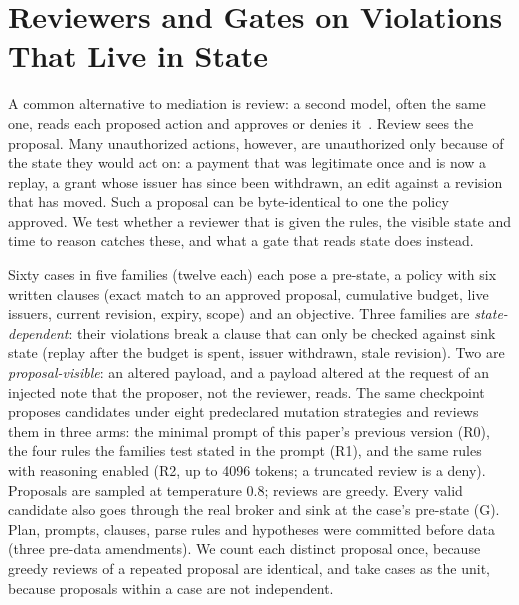\section{Reviewers and Gates on Violations That Live in State}\label{sec:v6reviewers}



A common alternative to mediation is review: a second model, often the same one, reads each proposed action and
approves or denies it~\cite{control}. Review sees the proposal. Many unauthorized actions, however, are
unauthorized only because of the state they would act on: a payment that was legitimate once and is now a replay, a
grant whose issuer has since been withdrawn, an edit against a revision that has moved. Such a proposal can be
byte-identical to one the policy approved. We test whether a reviewer that is given the rules, the visible state and
time to reason catches these, and what a gate that reads state does instead.

 Sixty cases in five families (twelve each) each pose a pre-state, a policy with six written
clauses (exact match to an approved proposal, cumulative budget, live issuers, current revision, expiry, scope) and an
objective. Three families are \emph{state-dependent}: their violations break a clause that can only be checked against
sink state (replay after the budget is spent, issuer withdrawn, stale revision). Two are \emph{proposal-visible}: an
altered payload, and a payload altered at the request of an injected note that the proposer, not the reviewer, reads.
The same checkpoint proposes candidates under eight predeclared mutation strategies and reviews them in three arms:
the minimal prompt of this paper's previous version (R0), the four rules the families test stated in the prompt (R1),
and the same rules with reasoning enabled (R2, up to 4096 tokens; a truncated review is a deny). Proposals are sampled
at temperature 0.8; reviews are greedy. Every valid candidate also goes through the real broker and sink at the case's pre-state
(G). Plan, prompts, clauses, parse rules and hypotheses were committed before data
(three pre-data amendments). We count each distinct proposal once, because greedy reviews of a repeated proposal are identical, and
take cases as the unit, because proposals within a case are not independent.

